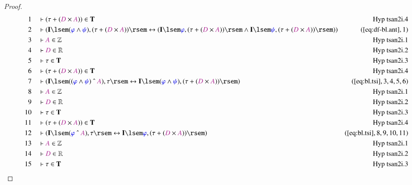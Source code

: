 \begin{proof}
\begin{align}
  1 &&  & \vdash ( \tau + ( \mc{D} \times \mc{A} ) ) \in
      \mathbf{T}&\text{Hyp~tsan2i.4}\notag%
  \\ 2 &&  & \vdash ( \mathbf{I} \lsem ( \mw{\varphi} \wedge \mw{\psi} ) , (
      \tau + ( \mc{D} \times \mc{A} ) ) \rsem
      \leftrightarrow ( \mathbf{I} \lsem \mw{\varphi} , (
      \tau + ( \mc{D} \times \mc{A} ) ) \rsem \wedge
      \mathbf{I} \lsem \mw{\psi} , ( \tau + ( \mc{D} \times
      \mc{A} ) ) \rsem )
      )&(\mbox{\ref{eq:df-bl.ant}},1)\notag
  \\ 3 &&  & \vdash \mc{A} \in \mathbb{Z}&\text{Hyp~tsan2i.1}\notag%
  \\ 4 &&  & \vdash \mc{D} \in \mathbb{R}&\text{Hyp~tsan2i.2}\notag%
  \\ 5 &&  & \vdash \tau \in \mathbf{T}&\text{Hyp~tsan2i.3}\notag%
  \\ 6 &&  & \vdash ( \tau + ( \mc{D} \times \mc{A} ) ) \in
      \mathbf{T}&\text{Hyp~tsan2i.4}\notag%
  \\ 7 &&  & \vdash ( \mathbf{I} \lsem ( ( \mw{\varphi} \wedge \mw{\psi} )
      ~\string^~ \mc{A} ) , \tau \rsem \leftrightarrow
      \mathbf{I} \lsem ( \mw{\varphi} \wedge \mw{\psi} ) ,
      ( \tau + ( \mc{D} \times \mc{A} ) ) \rsem
      )&(\mbox{\ref{eq:bl.tsi}},3,4,5,6)\notag
  \\ 8 &&  & \vdash \mc{A} \in \mathbb{Z}&\text{Hyp~tsan2i.1}\notag%
  \\ 9 &&  & \vdash \mc{D} \in \mathbb{R}&\text{Hyp~tsan2i.2}\notag%
  \\ 10 &&  & \vdash \tau \in \mathbf{T}&\text{Hyp~tsan2i.3}\notag%
  \\ 11 &&  & \vdash ( \tau + ( \mc{D} \times \mc{A} ) ) \in
      \mathbf{T}&\text{Hyp~tsan2i.4}\notag%
  \\ 12 &&  & \vdash ( \mathbf{I} \lsem ( \mw{\varphi} ~\string^~ \mc{A} ) ,
      \tau \rsem \leftrightarrow \mathbf{I} \lsem
      \mw{\varphi} , ( \tau + ( \mc{D} \times \mc{A} ) )
      \rsem )&(\mbox{\ref{eq:bl.tsi}},8,9,10,11)\notag
  \\ 13 &&  & \vdash \mc{A} \in
      \mathbb{Z}&\text{Hyp~tsan2i.1}\notag%
  \\ 14 &&  & \vdash \mc{D} \in
      \mathbb{R}&\text{Hyp~tsan2i.2}\notag%
  \\ 15 &&  & \vdash \tau \in \mathbf{T}&\text{Hyp~tsan2i.3}\notag%

\end{align}
\end{proof}
